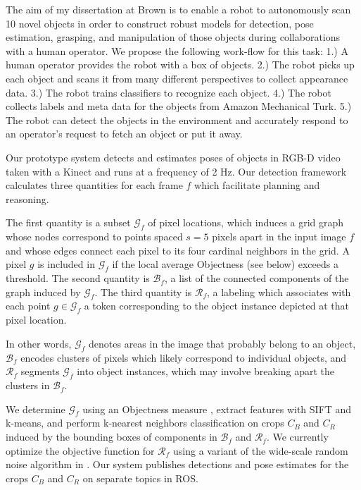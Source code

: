 \documentclass[12pt]{article}
\numberwithin{equation}{section}
\numberwithin{table}{section}
\numberwithin{figure}{section}
\begin{document}
The aim of my dissertation at Brown is to enable a robot
to autonomously scan 10 novel objects in order to construct robust models for detection,
pose estimation, grasping, and manipulation of those objects during collaborations with
a human operator. We propose the following work-flow for this task: 1.) A human operator provides
the robot with a box of objects. 2.) The robot picks up each object and scans it from many different
perspectives to collect appearance data. 3.) The robot trains classifiers to recognize each object. 
4.) The robot collects labels and meta data for the objects from Amazon Mechanical Turk. 5.) The
robot can detect the objects in the environment and accurately respond to an operator's request
to fetch an object or put it away.

Our prototype system detects and estimates poses of objects in RGB-D video taken with a Kinect and
runs at a frequency of 2 Hz. Our detection framework
calculates three quantities for each frame $f$ which facilitate
planning and reasoning. 

The first quantity is a subset $\mathcal{G}_f$ of pixel locations, which induces a grid graph whose nodes
correspond to points spaced $s=5$ pixels apart in the input image $f$ and whose edges connect each pixel to its
four cardinal neighbors in the grid. A pixel $g$ is included in $\mathcal{G}_f$ if the local average Objectness (see below)
exceeds a threshold. 
The second quantity is $\mathcal{B}_f$, a list of the connected components of the graph induced by $\mathcal{G}_f$.
The third quantity is $\mathcal{R}_f$, a labeling which associates with each point $g \in \mathcal{G}_f$ a token
corresponding to the object instance depicted at that pixel location.

In other words, $\mathcal{G}_f$ denotes areas in the image that probably belong to an object, 
$\mathcal{B}_f$ encodes clusters of pixels which likely correspond to individual objects, and $\mathcal{R}_f$
segments $\mathcal{G}_f$ into object instances, which may involve breaking apart the clusters in $\mathcal{B}_f$.

We determine $\mathcal{G}_f$ using an Objectness measure \cite{bing}, extract features with SIFT \cite{sift} 
and k-means, and perform k-nearest neighbors classification on crops $C_B$ and $C_R$ induced by the
bounding boxes of components in $\mathcal{B}_f$ and $\mathcal{R}_f$.
We currently optimize the objective function for $\mathcal{R}_f$ using a variant of the wide-scale random noise algorithm in \cite{wsrn}.
Our system publishes detections and pose estimates for the crops $C_B$ and $C_R$ on separate topics in ROS. 
\end{document}
